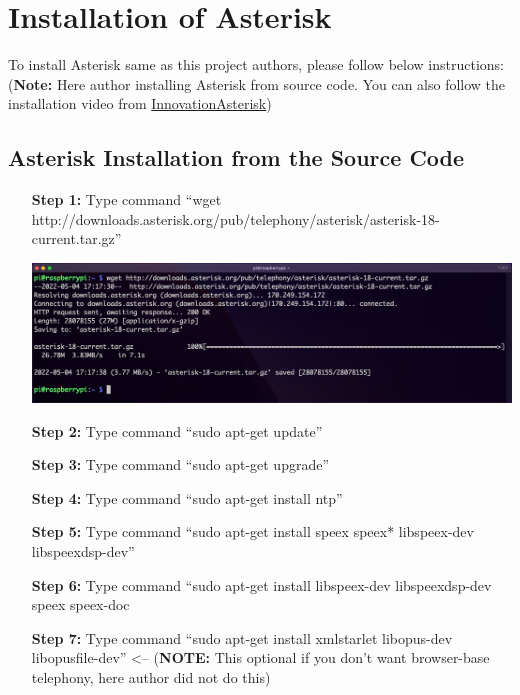 \section{Installation of Asterisk}	\label{sec:run-asterisk}
	To install Asterisk same as this project authors, please follow below instructions: (\textbf{Note:} Here author installing Asterisk from source code. You can also follow the installation video from \href{https://www.youtube.com/watch?v=52sEPVPV9JE&list=PLruX0IBTg1G4Auvo5YhoJKgskmMP7b8bJ&index=4&ab_channel=InnovateAsterisk}{InnovationAsterisk})
	
	\subsection{Asterisk Installation from the Source Code}
		\begin{itemize}[leftmargin=1.7cm]
			\item[\textbf{Step 1:}] Type command ``wget http://downloads.asterisk.org/pub/telephony/asterisk/asterisk-18-current.tar.gz''\\
				\begin{minipage}{\textwidth}
					\vspace{2mm}
					\includegraphics[scale=0.3]{Images/raspberry_pi/asterisk_install/wget.png}
					\vspace{2mm}
				\end{minipage}
			
			\item[\textbf{Step 2:}] Type command ``sudo apt-get update''
			\item[\textbf{Step 3:}] Type command ``sudo apt-get upgrade''
			\item[\textbf{Step 4:}] Type command ``sudo apt-get install ntp''			
			\item[\textbf{Step 5:}] Type command ``sudo apt-get install speex speex* libspeex-dev libspeexdsp-dev''
			\item[\textbf{Step 6:}] Type command ``sudo apt-get install libspeex-dev libspeexdsp-dev speex speex-doc
			\item[\textbf{Step 7:}] Type command ``sudo apt-get install xmlstarlet libopus-dev libopusfile-dev'' <-- (\textbf{NOTE:} This optional if you don't want browser-base telephony, here author did not do this)
			

\end{itemize}
